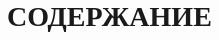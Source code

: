 \newsection
\section*{СОДЕРЖАНИЕ}
\tableofcontents
{}
{\parindent0pt
	\begin{xltabular}{\linewidth}{@{}p{0.85\linewidth}r{0.124\linewidth}} 
	\end{xltabular}
}
